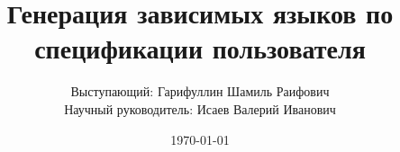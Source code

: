 \documentclass{beamer}
\title[Ген. зависимых языков]{Генерация зависимых языков по спецификации пользователя} %
\author[Гарифуллин Шамиль]
{
Выступающий: Гарифуллин Шамиль Раифович\\
{\small Научный руководитель: Исаев Валерий Иванович}
}
\institute[СПбАУ]{СПбАУ}
\date{\today} %
\begin{document}
\begin{frame}
\titlepage %
\end{frame}



\end{document}
